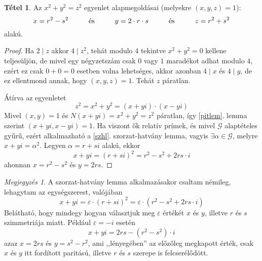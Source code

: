 \documentclass[12pt]{book}
\theoremstyle{plain} %
\theoremstyle{definition} %
\newtheorem{theo/}{Tétel}[section]
\newenvironment{theo}
  {\renewcommand{\qedsymbol}{$\clubsuit$}%
   \pushQED{\qed}\begin{theo/}}
  {\popQED\end{theo/}}
\theoremstyle{remark}
\newtheorem*{mj}{Megjegyzés}
\renewcommand\qedsymbol{$\blacksquare$}
\numberwithin{equation}{section}  %
\def\G{\mathcal{G}}
\begin{document}
	\begin{theo}
		Az $x^2+y^2=z^2$ egyenlet alapmegoldásai (melyekre $(x,y,z)=1$):
		\[ x=r^2-s^2 \hspace{10mm} \text{és} \hspace{10mm} y=2\cdot r \cdot s \hspace{10mm} \text{és} \hspace{10mm} z = r^2 + s^2 \]
		alakú.
	\end{theo}

	\begin{proof}
		Ha $2\mid z$ akkor $4\mid z^2$, tehát modulo $4$ tekintve $x^2+y^2=0$ kellene teljesüljön, de mivel egy négyzetszám csak $0$ vagy $1$ maradékot adhat modulo $4$, ezért ez csak $0+0=0$ esetben volna lehetséges, akkor azonban $4\mid x$ és $4\mid y$, de ez ellentmond annak, hogy $(x,y,z)=1$. Tehát $z$ páratlan.
		
		\begin{comment}
		Amennyiben $x$ és $y$ szintén mindketten páratlanok lennének, akkor $z^2$ páros lenne, amit az előbb zártunk ki. Tehát kimondhatjuk, hogy $x$ és $y$ különböző paritású, valamint $z$ páratlan. Legyen a továbbiakban $x$ páros (szimmetria miatt mindegy).
		\end{comment}
		
		Átírva az egyenletet
		\[ z^2 = x^2+y^2 = (x+yi)\cdot (x-yi)  \]
		Mivel $(x,y)=1$ és $N(x+yi)=x^2+y^2=z^2$ páratlan, így \ref{pitlem}. lemma szerint $(x+yi,x-yi)=1$. Ha viszont ők relatív prímek, és mivel $\G$ alaptételes gyűrű, ezért alkalmazható a \ref{szhl}. szorzat-hatvány lemma, vagyis $\exists \alpha \in \G$, melyre $x+yi=\alpha^2$. Legyen $\alpha = r+si$ alakú, ekkor
		\[ x+yi= (r+si)^2 = r^2-s^2 +2rs\cdot i  \]
		ahonnan $x=r^2-s^2$ és $y=2rs$.
	\end{proof}

	\begin{mj}
		A szorzat-hatvány lemma alkalmazásakor csaltam némileg, lehagytam az egységszerest, valójában
		\[ x+yi = \varepsilon \cdot (r+si)^2 = \varepsilon \cdot (r^2-s^2+2rs\cdot i)  \]
		Belátható, hogy mindegy hogyan választjuk meg $\varepsilon$ értékét $x$ és $y$, illetve $r$ és $s$ szimmetriája miatt. Például $\varepsilon = -i$ esetén
		\[ x+yi = 2rs - (r^2-s^2)\cdot i  \]
		azaz $x=2rs$ és $y=s^2-r^2$, ami ,,lényegében'' az előzőleg megkapott érték, csak $x$ és $y$ itt fordított paritású, illetve $r$ és $s$ szerepe is felcserélődött.
	\end{mj}
	
\end{document}
